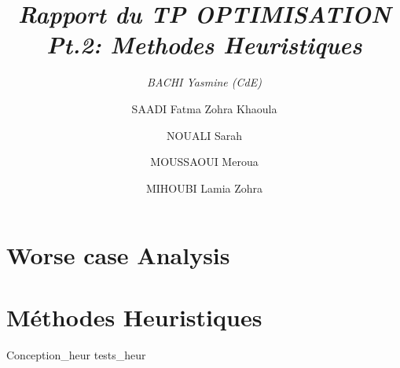 \documentclass[12pt,a4paper, titlepage]{article}
\title{\emph{Rapport du TP OPTIMISATION Pt.2: Methodes Heuristiques} }
\author{ 
    \emph{BACHI Yasmine (CdE)}
    \and
    SAADI Fatma Zohra Khaoula
    \and 
    NOUALI Sarah
    \and 
    MOUSSAOUI Meroua
    \and 
    MIHOUBI Lamia Zohra}
\begin{document}
\maketitle
\tableofcontents
\part{Worse case Analysis}
\newpage
\part{Méthodes Heuristiques}
{Conception_heur}
{tests_heur}
\end{document}
